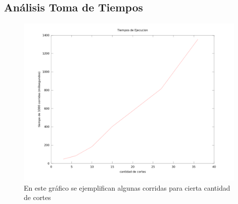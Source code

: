\subsection{Análisis Toma de Tiempos}

\begin{figure}[h]
\centering                                                       
        \includegraphics[width=320pt]{./figs/p3tiempos.png}
	\caption{En este gráfico se ejemplifican algunas corridas para cierta cantidad de cortes}
	\label{fig:p3tiempos}
\end{figure}

